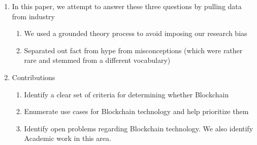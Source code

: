 \begin{enumerate}
	\item In this paper, we attempt to answer these three questions by pulling data from industry
	\begin{enumerate}
		\item We used a grounded theory process to avoid imposing our research bias
		\item Separated out fact from hype from misconceptions (which were rather rare and stemmed from a different vocabulary) 
	\end{enumerate}

	\item Contributions
	\begin{enumerate}
		\item Identify a clear set of criteria for determining whether Blockchain
		\item Enumerate use cases for Blockchain technology and help prioritize them
		\item Identify open problems regarding Blockchain technology. We also identify Academic work in this area.
	\end{enumerate}

\end{enumerate}